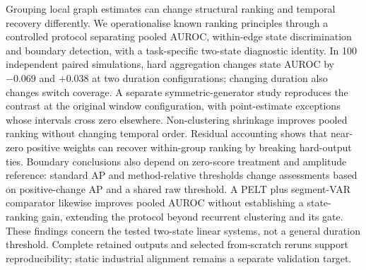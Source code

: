 Grouping local graph estimates can change structural ranking and temporal
recovery differently. We operationalise known ranking principles through a
controlled protocol separating pooled AUROC, within-edge state discrimination
and boundary detection, with a task-specific two-state diagnostic identity.
In 100 independent paired simulations, hard aggregation changes state AUROC
by $-0.069$ and $+0.038$ at two duration configurations; changing duration
also changes switch coverage. A separate symmetric-generator study reproduces
the contrast at the original window configuration, with point-estimate
exceptions whose intervals cross zero elsewhere.
Non-clustering shrinkage improves pooled ranking without changing temporal
order. Residual accounting shows that near-zero positive weights can
recover within-group ranking by breaking hard-output ties. Boundary conclusions
also depend on zero-score treatment and amplitude reference: standard AP and
method-relative thresholds change assessments based on positive-change AP and
a shared raw threshold. A PELT plus segment-VAR comparator likewise improves
pooled AUROC without establishing a state-ranking gain, extending the protocol
beyond recurrent clustering and its gate. These findings concern the tested
two-state linear systems, not a general duration threshold. Complete retained
outputs and selected from-scratch reruns support reproducibility; static
industrial alignment remains a separate validation target.
